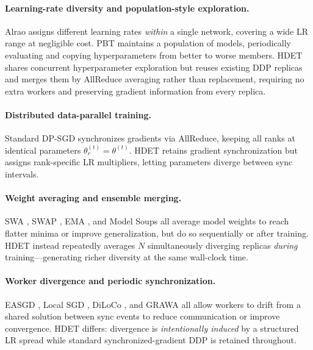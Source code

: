 \documentclass{article}
\begin{document}
\paragraph{Learning-rate diversity and population-style exploration.}
Alrao \citep{blier2019learning} assigns different learning rates \emph{within} a
single network, covering a wide LR range at negligible cost.
PBT \citep{jaderberg2017population} maintains a population of models, periodically
evaluating and copying hyperparameters from better to worse members.
HDET shares concurrent hyperparameter exploration but reuses existing DDP replicas
and merges them by AllReduce averaging rather than replacement, requiring no extra
workers and preserving gradient information from every replica.

\paragraph{Distributed data-parallel training.}
Standard DP-SGD \citep{li2020pytorch} synchronizes gradients via AllReduce, keeping
all ranks at identical parameters $\theta_r^{(t)} = \theta^{(t)}$.
HDET retains gradient synchronization but assigns rank-specific LR multipliers,
letting parameters diverge between sync intervals.

\paragraph{Weight averaging and ensemble merging.}
SWA \citep{izmailov2018averaging}, SWAP \citep{gupta2020stochastic}, EMA
\citep{ho2020denoising}, and Model Soups \citep{wortsman2022model} all average model
weights to reach flatter minima or improve generalization, but do so sequentially or
after training.
HDET instead repeatedly averages $N$ simultaneously diverging replicas \emph{during}
training---generating richer diversity at the same wall-clock time.

\paragraph{Worker divergence and periodic synchronization.}
EASGD \citep{zhang2015easgd}, Local SGD \citep{haddadpour2019local}, DiLoCo
\citep{douillard2023diloco}, and GRAWA \citep{dimlioglu2024grawa} all allow workers
to drift from a shared solution between sync events to reduce communication or improve
convergence.
HDET differs: divergence is \emph{intentionally induced} by a structured LR spread
while standard synchronized-gradient DDP is retained throughout.
\end{document}
